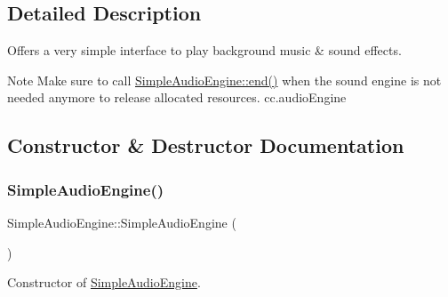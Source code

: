 \subsection{Detailed Description}
Offers a very simple interface to play background music \& sound effects. 

\begin{DoxyNote}{Note}
Make sure to call \hyperlink{classCocosDenshion_1_1SimpleAudioEngine_a2750af49fe41ee3fcf3d544f05ef3c73}{Simple\+Audio\+Engine\+::end()} when the sound engine is not needed anymore to release allocated resources.  cc.\+audio\+Engine 
\end{DoxyNote}


\subsection{Constructor \& Destructor Documentation}
\mbox{\label{classCocosDenshion_1_1SimpleAudioEngine_adf7921cc134fee55ccecd475b45414bc}} 
\subsubsection{\texorpdfstring{Simple\+Audio\+Engine()}{SimpleAudioEngine()}\hspace{0.1cm}{\footnotesize\ttfamily [1/2]}}
{\footnotesize\ttfamily Simple\+Audio\+Engine\+::\+Simple\+Audio\+Engine (\begin{DoxyParamCaption}{ }\end{DoxyParamCaption})\hspace{0.3cm}{\ttfamily [protected]}}

Constructor of \hyperlink{classCocosDenshion_1_1SimpleAudioEngine}{Simple\+Audio\+Engine}. \mbox{\label{classCocosDenshion_1_1SimpleAudioEngine_a3306ede2d562074bd8c9482ec0cd38fb}} 
